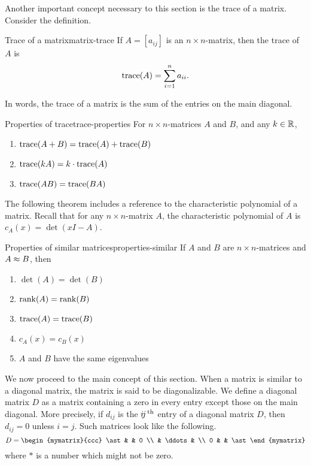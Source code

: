 Another important concept necessary to this section is the trace of a matrix. Consider the definition.

\begin{definition}{Trace of a matrix}{matrix-trace}
%
If $A=[a_{ij}]$ is an $n\times n$-matrix, then the
trace of $A$ is
\[ \mbox{\rm trace}(A) = \sum_{i=1}^n a_{ii}.\]
\end{definition}

In words, the trace of a matrix is the sum of the entries on the main diagonal. 

\begin{lemma}{Properties of trace}{trace-properties}
For $n\times n$-matrices $A$ and $B$, and any $k\in\mathbb{R}$,
\begin{enumerate}
\item $\mbox{\rm trace}(A+B)=\mbox{\rm trace}(A) + \mbox{\rm trace}(B)$
\item $\mbox{\rm trace}(kA)=k\cdot\mbox{\rm trace}(A)$
\item $\mbox{\rm trace}(AB)=\mbox{\rm trace}(BA)$
\end{enumerate}
\end{lemma}

The following theorem includes a reference to the characteristic polynomial of a matrix. Recall that for any $n \times n$-matrix $A$, the characteristic polynomial of $A$ is $c_A(x)=\det(xI-A)$.

\begin{theorem}{Properties of similar matrices}{properties-similar}
If $A$ and $B$ are $n\times n$-matrices and $A\approx B$, then
\begin{enumerate}
\item $\det(A) = \det(B)$
\item $\rank(A) = \rank(B)$
\item $\mbox{\rm trace}(A)= \mbox{\rm trace}(B)$
\item $c_A(x)=c_B(x)$
\item $A$ and $B$ have the same eigenvalues
\end{enumerate}
\end{theorem}

We now proceed to the main concept of this section. When a matrix is similar to a diagonal matrix, the matrix is said to
be
diagonalizable. 
We define a diagonal matrix $D$ as a matrix containing a zero in every entry 
except those on the main diagonal. More precisely, if $d_{ij}$ is the $i\!j^{\,\rm th}$ entry of a diagonal matrix $D$, then
$d_{ij}=0$ unless $i=j$. Such
matrices look like the following.
\begin{equation*}
D = \begin{mymatrix}{ccc}
\ast &  & 0 \\
& \ddots &  \\
0 &  & \ast
\end{mymatrix}
\end{equation*}
where $\ast $ is a number which might not be zero.

